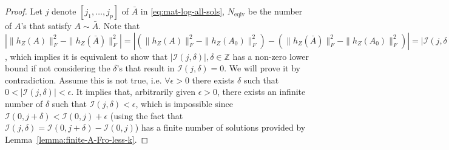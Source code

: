 \documentclass[letterpaper,10pt,journal,final]{IEEEtran}
\theoremstyle{definition}
\theoremstyle{remark}
\begin{document}
\begin{proof}
  Let $\textit{j}$ denote $[j_1, \dots, j_p]$ of $\bar{A}$ in \eqref{eq:mat-log-all-sols}, $N_\mathrm{eqiv}$ be the number of $A$'s that satisfy $A \sim \bar{A}$.
  Note that $|\|h_Z(A)\|_F^2 - \|h_Z(\bar{A})\|_F^2| = |(\|h_Z(A)\|_F^2 - \|h_Z(A_0)\|_F^2) - (\|h_Z(\bar{A})\|_F^2 - \|h_Z(A_0)\|_F^2)| = |\mathscr{I}(\textit{j}, \delta)|, \delta \in \mathbb{Z}$, which implies it is equivalent to show that $|\mathscr{I}(\textit{j}, \delta)|, \delta \in \mathbb{Z}$ has a non-zero lower bound if not considering the $\delta$'s that result in $\mathscr{I}(\textit{j}, \delta) =0$. We will prove it by contradiction. Assume this is not true, i.e. $\forall \epsilon >0$ there exists $\delta$ such that $0 < |\mathscr{I}(\textit{j}, \delta)| < \epsilon$. It implies that, arbitrarily given $\epsilon > 0$, there exists an infinite number of $\delta$ such that $\mathscr{I}(\textit{j}, \delta) < \epsilon$, which is impossible since $\mathscr{I}(0,\textit{j}+\delta) < \mathscr{I}(0, \textit{j}) + \epsilon$ (using the fact that $\mathscr{I}(\textit{j},\delta) = \mathscr{I}(0,\textit{j}+\delta) - \mathscr{I}(0, \textit{j})$) has a finite number of solutions provided by Lemma~\ref{lemma:finite-A-Fro-less-k}.
\end{proof}














\end{document}
